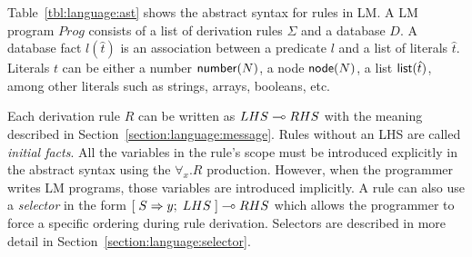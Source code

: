 Table~\ref{tbl:language:ast} shows the abstract syntax for rules in LM.  A LM
program $Prog$ consists of a list of derivation rules $\Sigma$ and a database
$D$. A database fact $l(\hat{t})$ is an association between a predicate $l$ and
a list of literals $\hat{t}$. Literals $t$ can be either a number
$\mathsf{number}(N)$, a node $\mathsf{node}(N)$, a list $\mathsf{list}(\hat{t})$, among other
literals such as strings, arrays, booleans, etc.

Each derivation rule $R$ can be written as $LHS \multimap RHS$ with the meaning
described in Section~\ref{section:language:message}. Rules without an LHS are
called \emph{initial facts}. All the variables in the rule's scope must be
introduced explicitly in the abstract syntax using the $\forall_x. R$
production. However, when the programmer writes LM programs, those variables are
introduced implicitly. A rule can also use a \emph{selector} in the form
$[\; S \Rightarrow y; \; LHS \;] \multimap RHS$ which allows the programmer to force a specific
ordering during rule derivation. Selectors are described in more detail in
Section~\ref{section:language:selector}.

\newcommand{\sop}[0]{\Vert}

